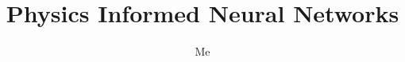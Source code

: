 \documentclass{article}
\begin{document}
\author{Me}
\title{Physics Informed Neural Networks} 
\maketitle 





{}

\end{document}
